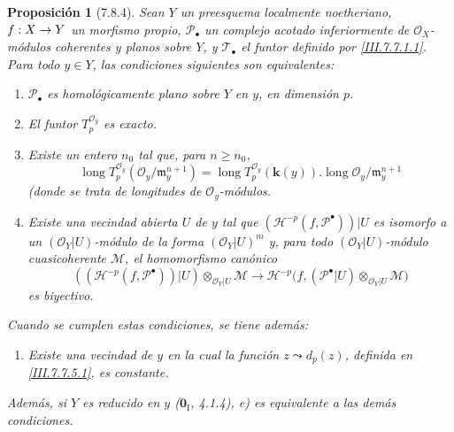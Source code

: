 \documentclass[10pt,oneside,openany]{book}
\theoremstyle{egaenv}\newtheorem*{env}{---}
\theoremstyle{egastatement}
\newtheorem*{proposition}{Proposición}
\theoremstyle{egadescription}
\renewcommand{\geq}{\geqslant}
\renewcommand{\to}{\mathchoice{\longrightarrow}{\rightarrow}{\rightarrow}{\rightarrow}}
\begin{document}
\begin{proposition}[7.8.4]
\label{III.7.8.4}
Sean $Y$ un preesquema localmente noetheriano, $f:X\to Y$ un
morfismo propio, $\mathscr P_\bullet$ un complejo acotado
inferiormente de $\mathscr O_X$-módulos coherentes y planos sobre
$Y$, y $\mathscr T_\bullet$ el funtor definido por
\eqref{III.7.7.1.1}. Para todo $y\in Y$, las condiciones siguientes
son equivalentes:
\begin{enumerate}
  \item[\textup{a)}] $\mathscr P_\bullet$ es homológicamente plano sobre $Y$
    en $y$, en dimensión $p$.
  \item[\textup{b)}] El funtor $T_p^{\mathscr O_y}$ es exacto.
  \item[\textup{c)}] Existe un entero $n_0$ tal que, para $n\geq n_0$,
    \[
      \operatorname{long}T_p^{\mathscr O_y}
        (\mathscr O_y/\mathfrak m_y^{n+1})
      =
      \operatorname{long}T_p^{\mathscr O_y}(\boldsymbol{k}(y))
      .
      \operatorname{long}\mathscr O_y/\mathfrak m_y^{n+1}
      \tag{7.8.4.1}\label{III.7.8.4.1.fr}
    \]
(donde se trata de longitudes de $\mathscr O_y$-módulos.
  \item[\textup{d)}] Existe una vecindad abierta $U$ de $y$ tal que
    $(\mathcal H^{-p}(f,\mathscr P^\bullet))|U$
    es isomorfo a un $(\mathscr O_Y|U)$-módulo de la forma
    $(\mathscr O_Y|U)^m$ y, para todo $(\mathscr O_Y|U)$-módulo
    cuasicoherente $\mathscr M$, el homomorfismo canónico
    \[
      ((\mathcal H^{-p}(f,\mathscr P^\bullet))|U)
      \otimes_{\mathscr O_Y|U}\mathscr M
      \longrightarrow
      \mathcal H^{-p}
      \bigl(
        f,(\mathscr P^\bullet|U)
          \otimes_{\mathscr O_Y|U}\mathscr M
      \bigr)
      \tag{7.8.4.2}\label{III.7.8.4.2.fr}
    \]
    es biyectivo.
\end{enumerate}
Cuando se cumplen estas condiciones, se tiene además:
\begin{enumerate}
  \item[\textup{e)}] Existe una vecindad de $y$ en la cual la función
    $z\leadsto d_p(z)$, definida en \eqref{III.7.7.5.1}, es
    constante.
\end{enumerate}
Además, si $Y$ es \textup{reducido} en $y$ \textup{($\mathbf{0}_{\mathrm I}$, 4.1.4)}, e) es
equivalente a las demás condiciones.
\end{proposition}
\end{document}

